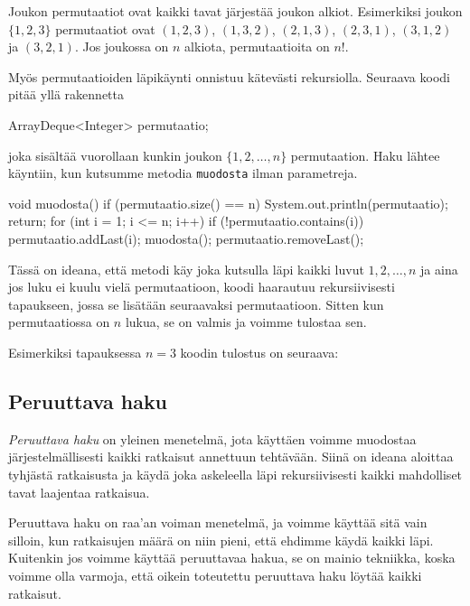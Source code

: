 Joukon permutaatiot ovat kaikki tavat järjestää joukon alkiot.
Esimerkiksi joukon $\{1,2,3\}$ permutaatiot ovat
$(1,2,3)$, $(1,3,2)$, $(2,1,3)$, $(2,3,1)$, $(3,1,2)$ ja $(3,2,1)$.
Jos joukossa on $n$ alkiota, permutaatioita on $n!$.

Myös permutaatioiden läpikäynti onnistuu kätevästi rekursiolla.
Seuraava koodi pitää yllä rakennetta

\begin{code}
ArrayDeque<Integer> permutaatio;
\end{code}

joka sisältää vuorollaan kunkin joukon $\{1,2,\dots,n\}$ permutaation.
Haku lähtee käyntiin, kun kutsumme metodia
\texttt{muodosta} ilman parametreja.

\begin{code}
void muodosta() {
    if (permutaatio.size() == n) {
        System.out.println(permutaatio);
        return;
    }
    for (int i = 1; i <= n; i++) {
        if (!permutaatio.contains(i)) {
            permutaatio.addLast(i);
            muodosta();
            permutaatio.removeLast();
        }
    }
}
\end{code}

Tässä on ideana, että metodi käy joka kutsulla läpi kaikki luvut
$1,2,\dots,n$ ja aina jos luku ei kuulu vielä permutaatioon,
koodi haarautuu rekursiivisesti tapaukseen, jossa se lisätään
seuraavaksi permutaatioon.
Sitten kun permutaatiossa on $n$ lukua, se on valmis ja
voimme tulostaa sen.

Esimerkiksi tapauksessa $n=3$ koodin tulostus on seuraava:

\begin{code}
[1, 2, 3]
[1, 3, 2]
[2, 1, 3]
[2, 3, 1]
[3, 1, 2]
[3, 2, 1]
\end{code}

\subsection{Peruuttava haku}

\emph{Peruuttava haku} on yleinen menetelmä,
jota käyttäen voimme muodostaa järjestelmällisesti
kaikki ratkaisut annettuun tehtävään.
Siinä on ideana aloittaa tyhjästä ratkaisusta ja käydä
joka askeleella läpi rekursiivisesti kaikki mahdolliset tavat laajentaa ratkaisua.

Peruuttava haku on raa'an voiman menetelmä,
ja voimme käyttää sitä vain silloin,
kun ratkaisujen määrä on niin pieni,
että ehdimme käydä kaikki läpi.
Kuitenkin jos voimme käyttää peruuttavaa hakua,
se on mainio tekniikka,
koska voimme olla varmoja, että oikein toteutettu
peruuttava haku löytää kaikki ratkaisut.

